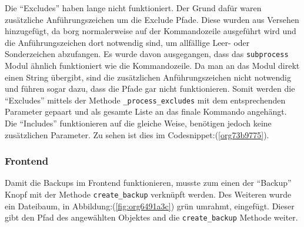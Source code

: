 Die "`Excludes"' haben lange nicht funktioniert. Der Grund dafür waren zusätzliche
Anführungszeichen um die Exclude Pfade. Diese wurden aus Versehen hinzugefügt,
da \gls{borg} normalerweise auf der Kommandozeile ausgeführt wird und die
Anführungszeichen dort notwendig sind, um allfällige Leer- oder Sonderzeichen
abzufangen. Es wurde davon ausgegangen, dass das \texttt{subprocess} Modul ähnlich
funktioniert wie die Kommandozeile. Da man an das Modul direkt einen String
übergibt, sind die zusätzlichen Anführungszeichen nicht notwendig und führen
sogar dazu, dass die Pfade gar nicht funktionieren. Somit werden die "`Excludes"'
mittels der Methode \texttt{\_process\_excludes} mit dem entsprechenden Parameter
gepaart und als gesamte Liste an das finale Kommando angehängt. Die "`Includes"'
funktionieren auf die gleiche Weise, benötigen jedoch keine zusätzlichen
Parameter. Zu sehen ist dies im Codesnippet:(\ref{org73b9775}).


\subsubsection{Frontend}
\label{sec:org148b087}

Damit die Backups im Frontend funktionieren, musste zum einen der "`Backup"' Knopf
mit der Methode \texttt{create\_backup} verknüpft werden. Des Weiteren wurde ein Dateibaum, in
Abbildung:(\ref{fig:org6491a3c}) grün umrahmt, eingefügt. Dieser gibt den Pfad
des angewählten Objektes and die \texttt{create\_backup} Methode weiter.

